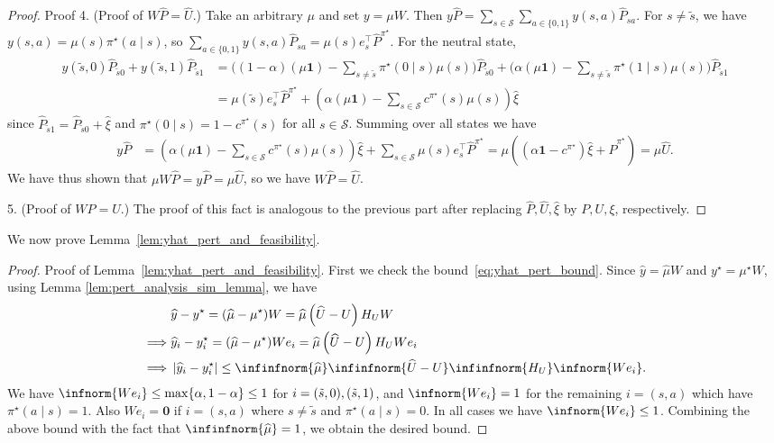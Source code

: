 \documentclass[mnsc,nonblindrev]{informs3}
\newcommand{\Phat}{\widehat{P}}
\newcommand{\one}{\mathbf{1}}
\newcommand{\pistar}{\pi^\star}
\newcommand{\States}{\mathcal{S}}
\newcommand{\zero}{\mathbf{0}}
\newcommand{\muhat}{\widehat{\mu}}
\newcommand{\uhat}{\widehat{U}}
\newcommand{\yhat}{\widehat{y}}
\newcommand{\xihat}{\widehat{\xi}}
\begin{document}
\begin{APPENDICES}
\begin{proof}{Proof}
4. (Proof of $W \Phat= \uhat$.)
Take an arbitrary $\mu$ and set $y=\mu W$.
Then
$
    y \Phat=\sum_{s\in \States}\sum_{a\in\{0,1\}} y(s,a)\Phat_{sa}.
$
For $s\neq \tilde s$, we have $y(s,a)=\mu(s)\pi^\star(a\mid s)$, so
$
    \sum_{a\in\{0,1\}} y(s,a)\Phat_{sa} = \mu(s)e_s^\top \Phat^{\pistar}.
$
For the neutral state,
\begin{align*}
    y(\tilde s,0) \Phat_{\tilde{s}0} + y(\tilde s,1) \Phat_{\tilde{s}1} 
    &=\Big((1-\alpha)(\mu\one)-\sum_{s\neq \tilde s}\pi^\star(0\mid s)\mu(s)\Big)\Phat_{\tilde{s}0} +\Big(\alpha(\mu\one)-\sum_{s\neq \tilde s}\pi^\star(1\mid s)\mu(s)\Big)\Phat_{\tilde{s}1} \\
    &= \mu(\tilde{s}) e_s^\top \Phat^{\pistar} + \left(\alpha (\mu \one) - \sum_{s \in \States} c^{\pistar}(s)\mu(s)\right) \xihat
\end{align*}
since $\Phat_{\tilde{s}1} = \Phat_{\tilde{s}0} + \xihat$ and $\pistar(0 \mid s) = 1 - c^{\pistar}(s)$ for all $s \in \States$.  Summing over all states we have
\begin{align*}
    y \Phat &= \left(\alpha (\mu \one) - \sum_{s \in \States} c^{\pistar}(s)\mu(s)\right) \xihat + \sum_{s \in \States} \mu(s) e_s^\top \Phat^{\pistar} 
    = \mu \left( \left( \alpha \one - c^{\pistar} \right) \xihat + \Phat^{\pistar}\right) 
    = \mu \uhat.
\end{align*}
We have thus shown that $\mu W \Phat =  y \Phat = \mu \uhat$, so we have $W \Phat = \uhat$.

5. (Proof of $W  P=U$.)
The proof of this fact is analogous to the previous part after replacing $\Phat, \uhat, \xihat$ by $P, U, \xi$, respectively.
\end{proof}

We now prove Lemma~\ref{lem:yhat_pert_and_feasibility}. 
\begin{proof}{Proof of Lemma~\ref{lem:yhat_pert_and_feasibility}.}
First we check the  bound~\eqref{eq:yhat_pert_bound}. Since $\yhat=\muhat W$ and $y^\star=\mu^\star W$, using Lemma \ref{lem:pert_analysis_sim_lemma}, we have
\begin{align}
    & \yhat - y^\star = (\muhat - \mu^\star)W =  \muhat \left(\uhat - U \right) H_{U} W \nonumber\\
    \implies & \yhat_i - y_i^\star = (\muhat - \mu^\star)We_i =  \muhat \left(\uhat - U \right) H_{U} We_i \nonumber\\
    \implies & \left| \yhat_i - y_i^\star \right| \leq  \infinfnorm{\muhat} \infinfnorm{\uhat - U} \infinfnorm{H_{U}} \infnorm{We_i} .\label{eq:yhat_pert_bound_int}
\end{align}
We have $\infnorm{We_i} \leq \max\{\alpha, 1-\alpha\} \leq 1$ for $i = (\Tilde{s}, 0), (\Tilde{s}, 1)$, and $\infnorm{We_i} = 1$ for the remaining $i=(s,a)$ which have $\pistar(a \mid s) = 1$. Also $We_i = \zero$ if $i = (s,a)$ where $s \neq \tilde{s} $ and $\pistar(a \mid s) = 0$. In all cases we have $\infnorm{W e_i} \leq 1$. Combining the above bound with the fact that $\infinfnorm{\muhat} = 1$, we obtain the desired bound.





\end{proof}
\end{APPENDICES}
\end{document}

